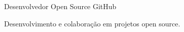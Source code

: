 

\begin{cventries}

  \cventry
    {Desenvolvedor} %
    {Open Source} %
    {GitHub} %
    {} %
    {
      \begin{cvitems} %
        \item {Desenvolvimento e colaboração em projetos open source.}
      \end{cvitems}
    }


\end{cventries}
